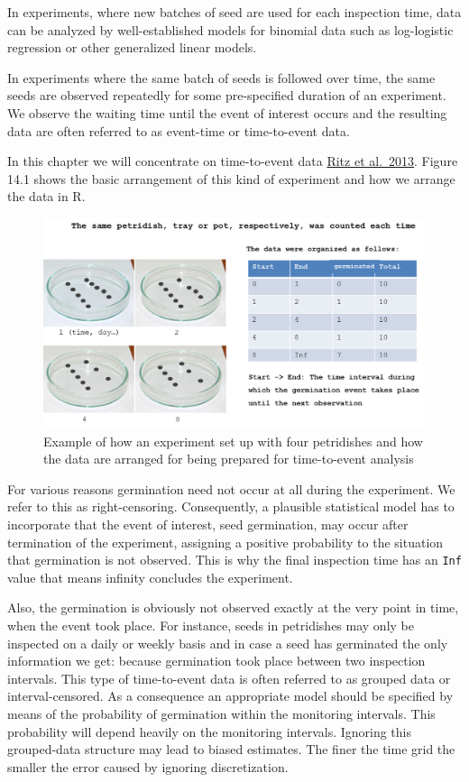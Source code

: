 \documentclass[letterpaper,]{book}
\begin{document}
In experiments, where new batches of seed are used for each inspection time, data can be analyzed by well-established models for binomial data such as log-logistic regression or other generalized linear models.

In experiments where the same batch of seeds is followed over time, the same seeds are observed repeatedly for some pre-specified duration of an experiment. We observe the waiting time until the event of interest occurs and the resulting data are often referred to as event-time or time-to-event data.

In this chapter we will concentrate on time-to-event data \href{http://www.sciencedirect.com/science/article/pii/S1161030112001360}{Ritz et al.~2013}. Figure 14.1 shows the basic arrangement of this kind of experiment and how we arrange the data in R.

\begin{figure}
\centering
\includegraphics{Picture_petridish.png}
\caption{Example of how an experiment set up with four petridishes and how the data are arranged for being prepared for time-to-event analysis}
\end{figure}

For various reasons germination need not occur at all during the experiment. We refer to this as right-censoring. Consequently, a plausible statistical model has to incorporate that the event of interest, seed germination, may occur after termination of the experiment, assigning a positive probability to the situation that germination is not observed. This is why the final inspection time has an \texttt{Inf} value that means infinity concludes the experiment.

Also, the germination is obviously not observed exactly at the very point in time, when the event took place. For instance, seeds in petridishes may only be inspected on a daily or weekly basis and in case a seed has germinated the only information we get: because germination took place between two inspection intervals. This type of time-to-event data is often referred to as grouped data or interval-censored. As a consequence an appropriate model should be specified by means of the probability of germination within the monitoring intervals. This probability will depend heavily on the monitoring intervals. Ignoring this grouped-data structure may lead to biased estimates. The finer the time grid the smaller the error caused by ignoring discretization.
\end{document}
